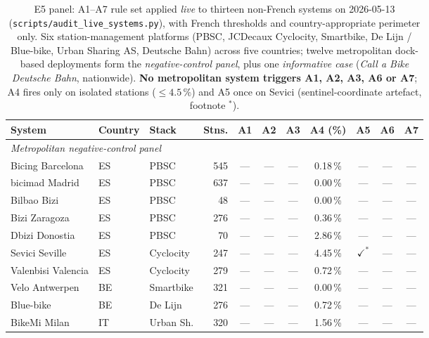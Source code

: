 \documentclass[11pt,a4paper]{article}
\begin{document}
\begin{table}[!htbp]
\centering
\caption{E5 panel: A1--A7 rule set applied \emph{live} to
thirteen non-French systems on 2026-05-13
(\texttt{scripts/audit\_live\_systems.py}), with French thresholds
and country-appropriate perimeter only. Six station-management
platforms (PBSC, JCDecaux Cyclocity, Smartbike, De Lijn /
Blue-bike, Urban Sharing AS, Deutsche Bahn) across five
countries; twelve metropolitan dock-based deployments form the
\emph{negative-control panel}, plus one \emph{informative case}
(\emph{Call a Bike Deutsche Bahn}, nationwide).
\textbf{No metropolitan system triggers A1, A2, A3, A6 or A7};
A4 fires only on isolated stations ($\leq 4.5\,\%$) and A5 once
on Sevici (sentinel-coordinate artefact, footnote $^\ast$).}
\label{tab:e5-pilot}
\scriptsize
\setlength{\tabcolsep}{4pt}
\begin{adjustbox}{max width=\textwidth}
\begin{tabular}{@{}lllr@{\hskip 6pt}ccccccc@{}}
\toprule
\textbf{System} & \textbf{Country} & \textbf{Stack} & \textbf{Stns.} & \textbf{A1} & \textbf{A2} & \textbf{A3} & \textbf{A4 (\%)} & \textbf{A5} & \textbf{A6} & \textbf{A7}\\
\midrule
\multicolumn{11}{l}{\emph{Metropolitan negative-control panel}}\\
Bicing Barcelona       & ES & PBSC      & 545  & --- & --- & --- & 0.18\,\% & --- & --- & --- \\
bicimad Madrid         & ES & PBSC      & 637  & --- & --- & --- & 0.00\,\% & --- & --- & --- \\
Bilbao Bizi            & ES & PBSC      & 48   & --- & --- & --- & 0.00\,\% & --- & --- & --- \\
Bizi Zaragoza          & ES & PBSC      & 276  & --- & --- & --- & 0.36\,\% & --- & --- & --- \\
Dbizi Donostia         & ES & PBSC      & 70   & --- & --- & --- & 2.86\,\% & --- & --- & --- \\
Sevici Seville         & ES & Cyclocity & 247  & --- & --- & --- & 4.45\,\% & $\checkmark^\ast$ & --- & --- \\
Valenbisi Valencia     & ES & Cyclocity & 279  & --- & --- & --- & 0.72\,\% & --- & --- & --- \\
Velo Antwerpen         & BE & Smartbike & 321  & --- & --- & --- & 0.00\,\% & --- & --- & --- \\
Blue-bike              & BE & De Lijn   & 276  & --- & --- & --- & 0.72\,\% & --- & --- & --- \\
BikeMi Milan           & IT & Urban Sh. & 320  & --- & --- & --- & 1.56\,\% & --- & --- & --- \\

\end{tabular}
\end{adjustbox}
\end{table}
\end{document}
